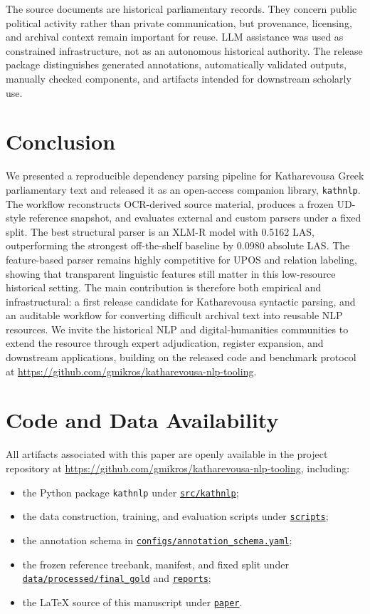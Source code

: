 \documentclass[11pt]{article}
\newcommand{\repobase}{https://github.com/gmikros/katharevousa-nlp-tooling}
\newcommand{\repofile}[1]{\href{\repobase/blob/main/#1}{\nolinkurl{#1}}}
\newcommand{\repodir}[1]{\href{\repobase/tree/main/#1}{\nolinkurl{#1}}}
\begin{document}
The source documents are historical parliamentary records. They concern public political activity rather than private communication, but provenance, licensing, and archival context remain important for reuse. LLM assistance was used as constrained infrastructure, not as an autonomous historical authority. The release package distinguishes generated annotations, automatically validated outputs, manually checked components, and artifacts intended for downstream scholarly use.

\section{Conclusion}

We presented a reproducible dependency parsing pipeline for Katharevousa Greek parliamentary text and released it as an open-access companion library, \texttt{kathnlp}. The workflow reconstructs OCR-derived source material, produces a frozen UD-style reference snapshot, and evaluates external and custom parsers under a fixed split. The best structural parser is an XLM-R model with 0.5162 LAS, outperforming the strongest off-the-shelf baseline by 0.0980 absolute LAS. The feature-based parser remains highly competitive for UPOS and relation labeling, showing that transparent linguistic features still matter in this low-resource historical setting. The main contribution is therefore both empirical and infrastructural: a first release candidate for Katharevousa syntactic parsing, and an auditable workflow for converting difficult archival text into reusable NLP resources. We invite the historical NLP and digital-humanities communities to extend the resource through expert adjudication, register expansion, and downstream applications, building on the released code and benchmark protocol at \url{\repobase}.

\section*{Code and Data Availability}

All artifacts associated with this paper are openly available in the project repository at \url{\repobase}, including:

\begin{itemize}[leftmargin=1.5em]
  \item the Python package \texttt{kathnlp} under \repodir{src/kathnlp};
  \item the data construction, training, and evaluation scripts under \repodir{scripts};
  \item the annotation schema in \repofile{configs/annotation_schema.yaml};
  \item the frozen reference treebank, manifest, and fixed split under \repodir{data/processed/final_gold} and \repodir{reports};
  \item the LaTeX source of this manuscript under \repodir{paper}.
\end{itemize}
\end{document}
